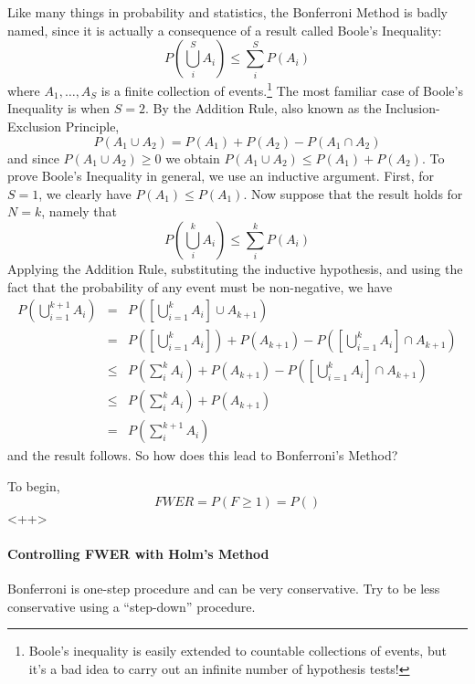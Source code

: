 Like many things in probability and statistics, the Bonferroni Method is badly named, since it is actually a consequence of a result called Boole's Inequality:
\begin{equation*}
  P\left( \bigcup_{i}^{S} A_i \right) \leq \sum_{i}^{S} P\left( A_{i} \right)
\end{equation*}
where $A_1, \hdots, A_S$ is a finite collection of events.\footnote{Boole's inequality is easily extended to countable collections of events, but it's a bad idea to carry out an infinite number of hypothesis tests!}
The most familiar case of Boole's Inequality is when $S=2$.
By the Addition Rule, also known as the Inclusion-Exclusion Principle, 
\begin{equation*}
  P(A_1\cup A_2) = P(A_1) + P(A_2) - P(A_1\cap A_2)
\end{equation*}
and since $P(A_1\cup A_2)\geq 0$ we obtain $P(A_1\cup A_2)\leq P(A_1) + P(A_2)$.
To prove Boole's Inequality in general, we use an inductive argument.
First, for $S=1$, we clearly have $P(A_1)\leq P(A_1)$.
Now suppose that the result holds for $N=k$, namely that
\begin{equation*}
  P\left( \bigcup_{i}^{k} A_i \right) \leq \sum_{i}^{k} P\left( A_{i} \right)
\end{equation*}
Applying the Addition Rule, substituting the inductive hypothesis, and using the fact that the probability of any event must be non-negative, we have
\begin{eqnarray*}
  P\left( \bigcup_{i=1}^{k+1} A_i \right) &=& P\left(\left[ \bigcup_{i=1}^{k} A_i\right] \cup A_{k+1} \right)\\
  &=& P\left(\left[ \bigcup_{i=1}^{k} A_i\right] \right) + P(A_{k+1}) - P\left(\left[ \bigcup_{i=1}^{k} A_i \right] \cap A_{k+1}  \right)\\
  &\leq& P\left( \sum_i^k A_i \right) + P(A_{k+1}) - P\left(\left[ \bigcup_{i=1}^{k} A_i \right] \cap A_{k+1}  \right)\\
  &\leq& P\left( \sum_i^k A_i \right) + P(A_{k+1}) \\
  &=& P\left( \sum_i^{k+1} A_i \right)
\end{eqnarray*}
and the result follows.
So how does this lead to Bonferroni's Method?

To begin, 
\begin{equation*}
  FWER = P(F\geq 1) = P\left(  \right)
\end{equation*}<++>

\paragraph{Controlling FWER with Holm's Method}
Bonferroni is one-step procedure and can be very conservative.
Try to be less conservative using a ``step-down'' procedure.

